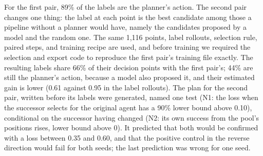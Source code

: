 \documentclass{article}
\theoremstyle{plain}
\theoremstyle{definition}
\theoremstyle{remark}
\begin{document}
For the first pair, 89\% of the labels are the planner's action. The second pair changes one thing: the label at each point is the best candidate among those a pipeline without a planner would have, namely the candidates proposed by a model and the random one. The same 1,116 points, label rollouts, selection rule, paired steps, and training recipe are used, and before training we required the selection and export code to reproduce the first pair's training file exactly. The resulting labels share 66\% of their decision points with the first pair's; 44\% are still the planner's action, because a model also proposed it, and their estimated gain is lower (0.61 against 0.95 in the label rollouts). The plan for the second pair, written before its labels were generated, named one test (N1: the loss when the successor selects for the original agent has a 90\% lower bound above 0.10), conditional on the successor having changed (N2: its own success from the pool's positions rises, lower bound above 0). It predicted that both would be confirmed with a loss between 0.35 and 0.60, and that the positive control in the reverse direction would fail for both seeds; the last prediction was wrong for one seed.
\end{document}
